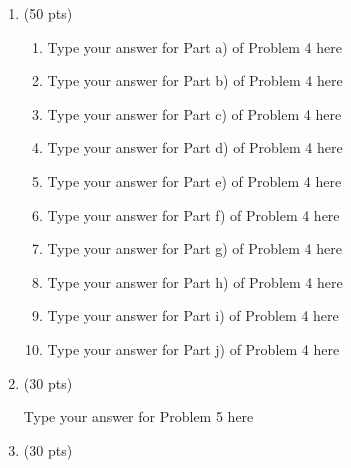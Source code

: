 \documentclass[11pt]{article}
\begin{document}
\begin{enumerate}
    \item \label{Problem_04} (50 pts)

      \begin{enumerate}

      \item Type your answer for Part a) of Problem 4 here

        \vskip 06pt
        \item Type your answer for Part b) of Problem 4 here

        \vskip 06pt
        \item Type your answer for Part c) of Problem 4 here

        \vskip 06pt
        \item Type your answer for Part d) of Problem 4 here

        \vskip 06pt
        \item Type your answer for Part e) of Problem 4 here

        \vskip 06pt
        \item Type your answer for Part f) of Problem 4 here

        \vskip 06pt
        \item Type your answer for Part g) of Problem 4 here

        \vskip 06pt
        \item Type your answer for Part h) of Problem 4 here

        \vskip 06pt
        \item Type your answer for Part i) of Problem 4 here

        \vskip 06pt
        \item Type your answer for Part j) of Problem 4 here

      \end{enumerate}


    \item \label{Problem_05} (30 pts)

        Type your answer for Problem 5 here


    \item \label{Problem_06} (30 pts)


\end{enumerate}
\end{document}
